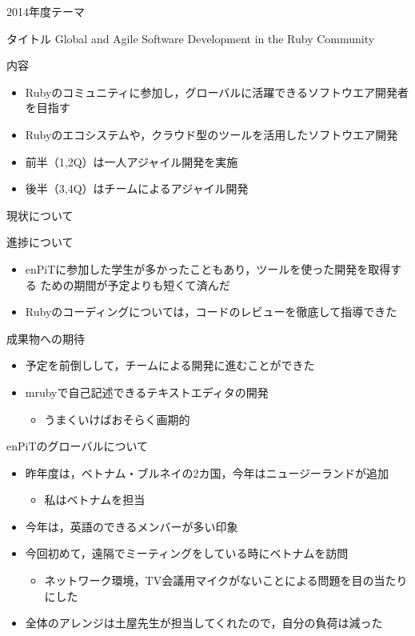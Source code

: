 \documentclass[t]{beamer}
\begin{document}
\begin{frame}[label=sec-7]{2014年度テーマ}
\begin{block}{タイトル}
Global and Agile Software Development in the Ruby Community
\end{block}

\begin{block}{内容}
\begin{itemize}
\item Rubyのコミュニティに参加し，グローバルに活躍できるソフトウエア開発者
を目指す
\item Rubyのエコシステムや，クラウド型のツールを活用したソフトウエア開発
\item 前半（1,2Q）は一人アジャイル開発を実施
\item 後半（3,4Q）はチームによるアジャイル開発
\end{itemize}
\end{block}
\end{frame}
\begin{frame}[label=sec-8]{現状について}
\begin{block}{進捗について}
\begin{itemize}
\item enPiTに参加した学生が多かったこともあり，ツールを使った開発を取得する
ための期間が予定よりも短くて済んだ
\item Rubyのコーディングについては，コードのレビューを徹底して指導できた
\end{itemize}
\end{block}

\begin{block}{成果物への期待}
\begin{itemize}
\item 予定を前倒しして，チームによる開発に進むことができた
\item mrubyで自己記述できるテキストエディタの開発
\begin{itemize}
\item うまくいけばおそらく画期的
\end{itemize}
\end{itemize}
\end{block}
\end{frame}
\begin{frame}[label=sec-9]{enPiTのグローバルについて}
\begin{itemize}
\item 昨年度は，ベトナム・ブルネイの2カ国，今年はニュージーランドが追加
\begin{itemize}
\item 私はベトナムを担当
\end{itemize}
\item 今年は，英語のできるメンバーが多い印象
\item 今回初めて，遠隔でミーティングをしている時にベトナムを訪問
\begin{itemize}
\item ネットワーク環境，TV会議用マイクがないことによる問題を目の当たりにした
\end{itemize}
\item 全体のアレンジは土屋先生が担当してくれたので，自分の負荷は減った
\end{itemize}
\end{frame}
\end{document}
